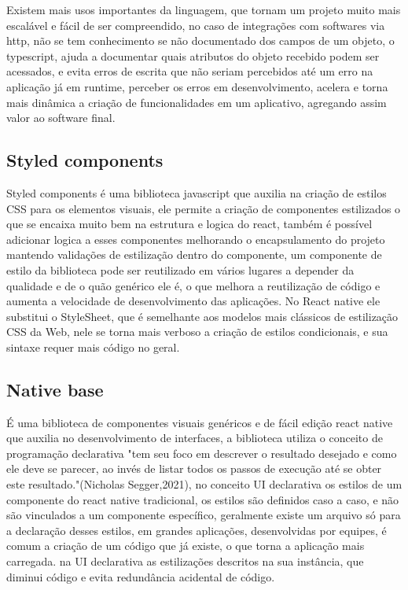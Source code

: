 \documentclass{ufersa}
\begin{document}
Existem mais usos importantes da linguagem, que tornam um projeto muito mais escalável e fácil de ser compreendido, no caso de integrações com softwares via http, não se tem conhecimento se não documentado dos campos de um objeto, o typescript, ajuda a documentar quais atributos do objeto recebido podem ser acessados, e evita erros de escrita que não seriam percebidos até um erro na aplicação já em runtime, perceber os erros em desenvolvimento, acelera e torna mais dinâmica a criação de funcionalidades em um aplicativo, agregando assim valor ao software final.

\subsection{Styled components}

Styled components é uma biblioteca javascript que auxilia na criação de estilos CSS para os elementos visuais, ele permite a criação de componentes estilizados o que se encaixa muito bem na estrutura e logica do react, também é possível adicionar logica a esses componentes melhorando o encapsulamento do projeto mantendo validações de estilização dentro do componente, um componente de estilo da biblioteca pode ser reutilizado em vários lugares a depender da qualidade e de o quão genérico ele é, o que melhora a reutilização de código e aumenta a velocidade de desenvolvimento das aplicações. No React native ele substitui o StyleSheet, que é semelhante aos modelos mais clássicos de estilização CSS da Web, nele se torna mais verboso a criação de estilos condicionais, e sua sintaxe requer mais código no geral.

\subsection{Native base}

É uma biblioteca de componentes visuais genéricos e de fácil edição react native que auxilia no desenvolvimento de interfaces, a biblioteca utiliza o conceito de programação declarativa "tem seu foco em descrever o resultado desejado e como ele deve se parecer, ao invés de listar todos os passos de execução até se obter este resultado."(Nicholas Segger,2021), no conceito UI declarativa os estilos de um componente do react native tradicional, os estilos são definidos caso a caso, e não são vinculados a um componente específico, geralmente existe um arquivo só para a declaração desses estilos, em grandes aplicações, desenvolvidas por equipes, é comum a criação de um código que já existe, o que torna a aplicação mais carregada. na UI declarativa as estilizações descritos na sua instância, que diminui código e evita redundância acidental de código.  
\end{document}
